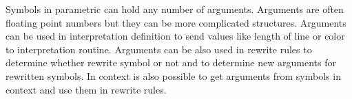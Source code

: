 Symbols in parametric \lsystems can hold any number of arguments.
Arguments are often floating point numbers but they can be more complicated structures.
Arguments can be used in interpretation definition to send values like length of line or color to interpretation routine.
Arguments can be also used in rewrite rules to determine whether rewrite symbol or not and to determine new arguments for rewritten symbols.
In context \twolsystems is also possible to get arguments from symbols in context and use them in rewrite rules.




































